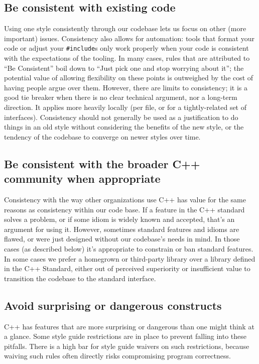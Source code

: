 \subsection{Be consistent with existing code}
Using one style consistently through our codebase lets us focus on other (more important) issues. Consistency also allows for automation: tools that format your code or adjust your \texttt{#include}s only work properly when your code is consistent with the expectations of the tooling. In many cases, rules that are attributed to \enquote{Be Consistent} boil down to \enquote{Just pick one and stop worrying about it}; the potential value of allowing flexibility on these points is outweighed by the cost of having people argue over them. However, there are limits to consistency; it is a good tie breaker when there is no clear technical argument, nor a long-term direction. It applies more heavily locally (per file, or for a tightly-related set of interfaces). Consistency should not generally be used as a justification to do things in an old style without considering the benefits of the new style, or the tendency of the codebase to converge on newer styles over time.
\subsection{Be consistent with the broader C++ community when appropriate}
Consistency with the way other organizations use C++ has value for the same reasons as consistency within our code base. If a feature in the C++ standard solves a problem, or if some idiom is widely known and accepted, that\rq s an argument for using it. However, sometimes standard features and idioms are flawed, or were just designed without our codebase's needs in mind. In those cases (as described below) it's appropriate to constrain or ban standard features. In some cases we prefer a homegrown or third-party library over a library defined in the C++ Standard, either out of perceived superiority or insufficient value to transition the codebase to the standard interface.
\subsection{Avoid surprising or dangerous constructs}
C++ has features that are more surprising or dangerous than one might think at a glance. Some style guide restrictions are in place to prevent falling into these pitfalls. There is a high bar for style guide waivers on such restrictions, because waiving such rules often directly risks compromising program correctness.
